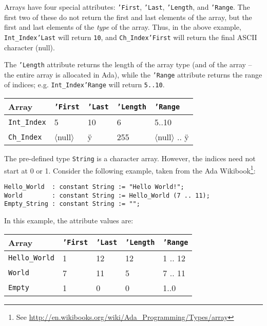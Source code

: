  

 Arrays have four special attributes: \texttt{'First}, \texttt{'Last}, \texttt{'Length}, and \texttt{'Range}. The first two of these do not return the first and last elements of the array, but the first and last elements of the \emph{type} of the array. Thus, in the above example, \texttt{Int\_Index'Last} will return \texttt{10}, and \texttt{Ch\_Index'First} will return the final ASCII character (null).

The \texttt{'Length} attribute returns the length of the array type (and of the array -- the entire array is allocated in Ada), while the \texttt{'Range} attribute returns the range of indices; e.g. \texttt{Int\_Index'Range} will return \texttt{5..10}.

\begin{center}
\begin{tabular}{lllll}
\toprule
\textbf{Array} &  \texttt{'First} & \texttt{'Last} & \texttt{'Length} & \texttt{'Range}\\
\midrule
 \texttt{Int\_Index} & 5 & 10 & 6 & 5..10\\
 \texttt{Ch\_Index} & $\langle$null$\rangle$ & \"y & 255 & $\langle$null$\rangle$ ..  \"y\\
\bottomrule
\end{tabular}
\end{center}

The pre-defined type \texttt{String} is a character array. However, the indices need not start at 0 or 1. Consider the following example, taken from the Ada Wikibook\footnote{See \url{http://en.wikibooks.org/wiki/Ada_Programming/Types/array}}:

\begin{lstlisting}[caption={Attributes of strings}]
Hello_World  : constant String := "Hello World!";
World        : constant String := Hello_World (7 .. 11);
Empty_String : constant String := "";
\end{lstlisting}

In this example, the attribute values are:


\begin{center}
\begin{tabular}{lllll}
\toprule
\textbf{Array} &  \texttt{'First} & \texttt{'Last} & \texttt{'Length} & \texttt{'Range}\\
\midrule
 \texttt{Hello\_World} & 1 & 12 & 12 & 1 .. 12\\
 \texttt{World} & 7 & 11 & 5 & 7 .. 11\\
 \texttt{Empty} & 1 & 0 & 0 & 1..0\\
\bottomrule
\end{tabular}
\end{center}

